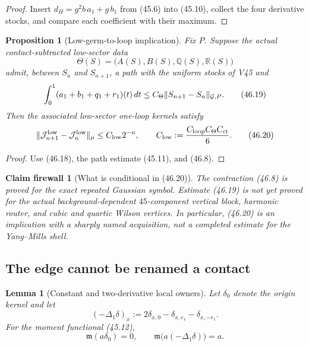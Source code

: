 \documentclass[11pt,oneside]{book}
\newtheorem{lemma}[theorem]{Lemma}
\newtheorem{proposition}[theorem]{Proposition}
\newtheorem{firewall}[theorem]{Claim firewall}
\theoremstyle{definition}
\theoremstyle{remark}
\begin{document}
\begin{proof}
Insert
\(d_H=g^2b\,a_1+g\,b_1\) from (45.6) into (45.10), collect the
four derivative stocks, and compare each coefficient with their
maximum.
\end{proof}

\begin{proposition}[Low-germ-to-loop implication]
\label{prop:e8v46-low-compiler}
Fix \(P\).  Suppose the actual contact-subtracted low-sector data
\[
 \Theta(S)=\bigl(A(S),B(S),{\mathbb Q}(S),{\mathbb R}(S)\bigr)
\]
admit, between \(S_n\) and \(S_{n+1}\), a path with the uniform
stocks of V45 and
\[
 \int_0^1(a_1+b_1+q_1+r_1)(t)\,dt
 \le C_\Theta\|S_{n+1}-S_n\|_{{\cal G},P}.                    \tag{46.19}
\]
Then the associated low-sector one-loop kernels satisfy
\[
 \|{\cal J}^{\rm low}_{n+1}-{\cal J}^{\rm low}_n\|_\mu
 \le C_{\rm low}2^{-n},\qquad
 C_{\rm low}:=\frac{C_{\rm loop}C_\Theta C_{\rm ct}}6.         \tag{46.20}
\]
\end{proposition}

\begin{proof}
Use (46.18), the path estimate (45.11), and (46.8).
\end{proof}

\begin{firewall}[What is conditional in (46.20)]
\label{fire:e8v46-low-conditional}
The contraction (46.8) is proved for the exact repeated Gaussian
symbol.  Estimate (46.19) is not yet proved for the actual
background-dependent \(45\)-component vertical block, harmonic
router, and cubic and quartic Wilson vertices.  In particular,
(46.20) is an implication with a sharply named acquisition, not a
completed estimate for the Yang--Mills shell.
\end{firewall}

\subsection{The edge cannot be renamed a contact}

\begin{lemma}[Constant and two-derivative local owners]
\label{lem:e8v46-local-moments}
Let \(\delta_0\) denote the origin kernel and let
\[
 (-\Delta_1\delta)_x:=2\delta_{x,0}
                  -\delta_{x,e_1}-\delta_{x,-e_1}.
\]
For the moment functional (45.12),
\[
 {\mathfrak m}(a\delta_0)=0,\qquad
 {\mathfrak m}\bigl(a(-\Delta_1\delta)\bigr)=a.                \tag{46.21}
\]
\end{lemma}
\end{document}
